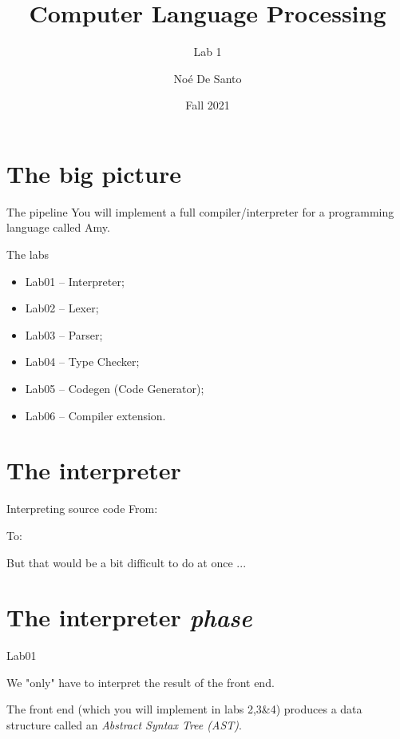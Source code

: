 \documentclass{beamer}
\title{Computer Language Processing}
\subtitle{Lab 1}
\author{Noé De Santo}
\date{Fall 2021}
\begin{document}
    \frame{\titlepage}

    \section{The big picture}

    \begin{frame}{The pipeline}
        You will implement a full compiler/interpreter for 
        a programming language called Amy.

        \centering
    \end{frame}

    \begin{frame}{The labs}
        \begin{itemize}
            \item Lab01 -- Interpreter;
            \item Lab02 -- Lexer;
            \item Lab03 -- Parser;
            \item Lab04 -- Type Checker;
            \item Lab05 -- Codegen (Code Generator);
            \item Lab06 -- Compiler extension.
        \end{itemize}
    \end{frame}


    \section{The interpreter}

    \begin{frame}[fragile]{Interpreting source code}
        From:

        To:

    \pause
        \vspace{2em}
        But that would be a bit difficult to do at once ...
    \end{frame}

    \section{The interpreter \emph{phase}}

    \begin{frame}{Lab01}

        We "only" have to interpret the result of the front end.

        The front end (which you will implement in labs 2,3\&4) 
        produces a data structure called an \emph{Abstract Syntax Tree (AST)}.
    \end{frame}
\end{document}
